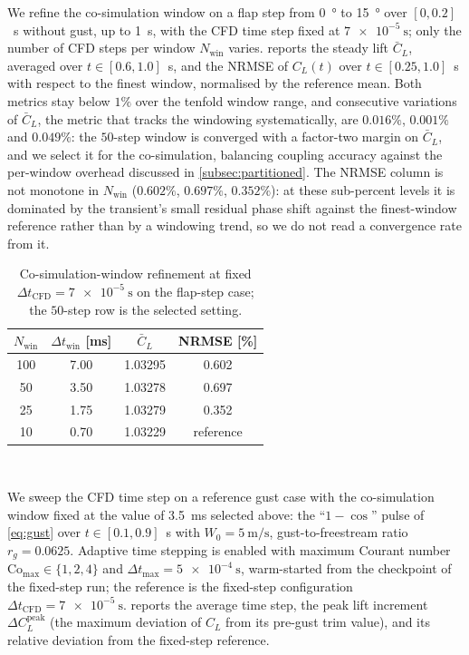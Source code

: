 We refine the co-simulation window on a flap step from \SI{0}{\degree} to \SI{15}{\degree} over $[0,0.2]$~\si{\second} without gust, up to \SI{1}{\second}, with the CFD time step fixed at $\SI{7e-5}{\second}$; only the number of CFD steps per window $N_{\mathrm{win}}$ varies.  reports the steady lift $\bar C_L$, averaged over $t\in[0.6,1.0]$~\si{\second}, and the NRMSE of $C_L(t)$ over $t\in[0.25,1.0]$~\si{\second} with respect to the finest window, normalised by the reference mean. Both metrics stay below $1\%$ over the tenfold window range, and consecutive variations of $\bar C_L$, the metric that tracks the windowing systematically, are $0.016\%$, $0.001\%$ and $0.049\%$: the $50$-step window is converged with a factor-two margin on $\bar C_L$, and we select it for the co-simulation, balancing coupling accuracy against the per-window overhead discussed in \cref{subsec:partitioned}. The NRMSE column is not monotone in $N_{\mathrm{win}}$ ($0.602\%$, $0.697\%$, $0.352\%$): at these sub-percent levels it is dominated by the transient's small residual phase shift against the finest-window reference rather than by a windowing trend, so we do not read a convergence rate from it.

\begin{table}[t]
    \centering
    \begin{tabular}{|c|c|c|c|}
    \hline
    \rowcolor{bluePoli!40}
    $N_{\mathrm{win}}$ & $\Delta t_{\mathrm{win}}$ [\si{\milli\second}] & $\bar C_L$ & NRMSE [\%] \T\B \\
    \hline\hline
    100 & 7.00 & 1.03295 & 0.602 \T\B \\
    \hline
    50  & 3.50 & 1.03278 & 0.697 \T\B \\
    \hline
    25  & 1.75 & 1.03279 & 0.352 \T\B \\
    \hline
    10  & 0.70 & 1.03229 & reference \B \\
    \hline
    \end{tabular}
    \\[6pt]
    \caption{Co-simulation-window refinement at fixed $\Delta t_{\mathrm{CFD}} = \SI{7e-5}{\second}$ on the flap-step case; the $50$-step row is the selected setting.}
    \label{tab:appA_window}
\end{table}

We sweep the CFD time step on a reference gust case with the co-simulation window fixed at the value of \SI{3.5}{\milli\second} selected above: the ``$1-\cos$'' pulse of \cref{eq:gust} over $t\in[0.1,0.9]$~\si{\second} with $W_0=\SI{5}{\meter\per\second}$, gust-to-freestream ratio $r_g=0.0625$. Adaptive time stepping is enabled with maximum Courant number $\mathrm{Co}_{\max}\in\{1,2,4\}$ and $\Delta t_{\max} = \SI{5e-4}{\second}$, warm-started from the checkpoint of the fixed-step run; the reference is the fixed-step configuration $\Delta t_{\mathrm{CFD}} = \SI{7e-5}{\second}$.  reports the average time step, the peak lift increment $\Delta C_L^{\mathrm{peak}}$ (the maximum deviation of $C_L$ from its pre-gust trim value), and its relative deviation from the fixed-step reference.

